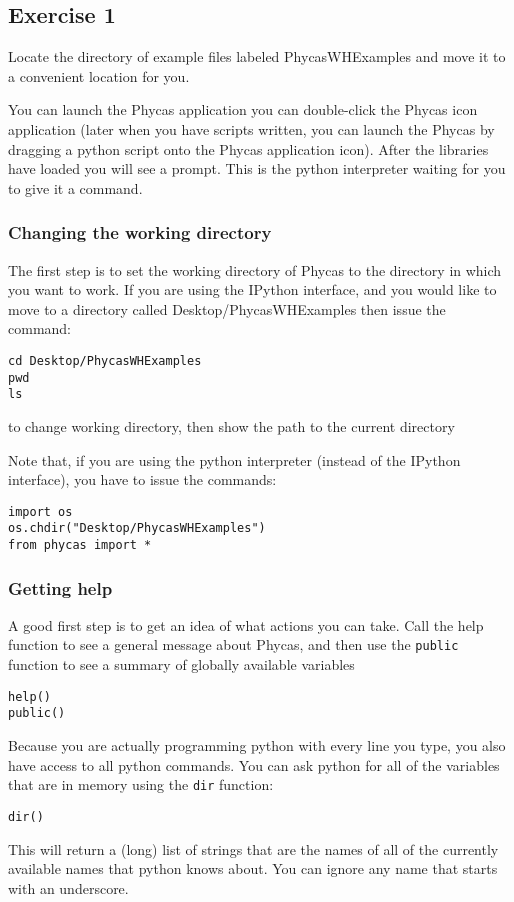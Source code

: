 \documentclass{article}
\newcommand{\cmd}[1]{\texttt{#1}\xspace}
\newcommand{\phycas}{Phycas\xspace}
\newcommand{\localfile}[1]{\textsf{#1}\xspace}
\begin{document}
\subsection{Exercise 1}
Locate the directory of example files labeled \localfile{PhycasWHExamples} and move it to a convenient location for you.

You can launch the \phycas application you can double-click the \phycas icon application (later when you have scripts written, you can launch the \phycas by dragging a python script onto the \phycas application icon).
After the libraries have loaded you will see a prompt.
This is the python interpreter waiting for you to give it a command.

\subsubsection{Changing the working directory}
The first step is to set the working directory of \phycas to the directory in which you want to work.
If you are using the IPython interface, and you would like to  move to a directory called \localfile{Desktop/PhycasWHExamples} then issue the command:
\begin{verbatim}
cd Desktop/PhycasWHExamples
pwd
ls
\end{verbatim}
to change working directory, then show the path to the current directory

Note that, if you are using the  python interpreter (instead of the IPython interface), you have to issue the commands:
\begin{verbatim}
import os
os.chdir("Desktop/PhycasWHExamples")
from phycas import *
\end{verbatim}

\subsubsection{Getting help}
A good first step is to get an idea of what actions you can take. 
Call the help function to see a general message about \phycas, and then
use the \cmd{public} function to see a summary of globally available
variables
\begin{verbatim}
help()
public()
\end{verbatim}

Because you are actually programming python with every line you type, you 
also have access to all python commands.
You can ask python for all of the variables that are in memory using the
\cmd{dir} function:
\begin{verbatim}
dir()
\end{verbatim}
This will return a (long) list of strings that are the names of all of the currently
available names that python knows about.  
You can ignore any name that starts with an underscore.
\end{document}
